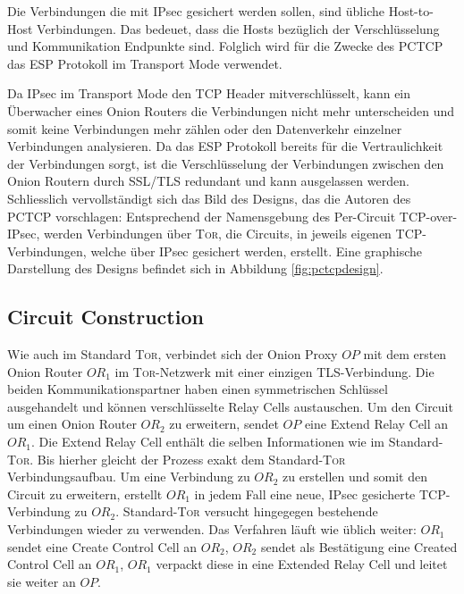 \documentclass[fleqn,envcountsame,runningheads,10pt,a4paper]{llncs}
\begin{document}
Die Verbindungen die mit IPsec gesichert werden sollen, sind übliche Host-to-Host Verbindungen. Das bedeuet, dass die Hosts bezüglich der Verschlüsselung und Kommunikation Endpunkte sind. Folglich wird für die Zwecke des PCTCP das ESP Protokoll im Transport Mode verwendet.

Da IPsec im Transport Mode den TCP Header mitverschlüsselt, kann ein Überwacher eines Onion Routers die Verbindungen nicht mehr unterscheiden und somit keine Verbindungen mehr zählen oder den Datenverkehr einzelner Verbindungen analysieren. Da das ESP Protokoll bereits für die Vertraulichkeit der Verbindungen sorgt, ist die Verschlüsselung der Verbindungen zwischen den Onion Routern durch SSL/TLS redundant und kann ausgelassen werden. Schliesslich vervollständigt sich das Bild des Designs, das die Autoren des PCTCP vorschlagen: Entsprechend der Namensgebung des Per-Circuit TCP-over-IPsec, werden Verbindungen über \textsc{Tor}, die Circuits, in jeweils eigenen TCP-Verbindungen, welche über IPsec gesichert werden, erstellt. Eine graphische Darstellung des Designs befindet sich in Abbildung \ref{fig:pctcpdesign}.

\subsection{Circuit Construction}

Wie auch im Standard \textsc{Tor}, verbindet sich der Onion Proxy $\textit{OP}$ mit dem ersten Onion Router $\textit{OR}_1$ im \textsc{Tor}-Netzwerk mit einer einzigen TLS-Verbindung. Die beiden Kommunikationspartner haben einen symmetrischen Schlüssel ausgehandelt und können verschlüsselte Relay Cells austauschen. Um den Circuit um einen Onion Router $\textit{OR}_2$ zu erweitern, sendet $\textit{OP}$ eine Extend Relay Cell an $\textit{OR}_1$. Die Extend Relay Cell enthält die selben Informationen wie im Standard-\textsc{Tor}. Bis hierher gleicht der Prozess exakt dem Standard-\textsc{Tor} Verbindungsaufbau. Um eine Verbindung zu $\textit{OR}_2$ zu erstellen und somit den Circuit zu erweitern, erstellt $\textit{OR}_1$ in jedem Fall eine neue, IPsec gesicherte TCP-Verbindung zu $\textit{OR}_2$. Standard-\textsc{Tor} versucht hingegegen bestehende Verbindungen wieder zu verwenden. Das Verfahren läuft wie üblich weiter: $\textit{OR}_1$ sendet eine Create Control Cell an $\textit{OR}_2$, $\textit{OR}_2$ sendet als Bestätigung eine Created Control Cell an $\textit{OR}_1$, $\textit{OR}_1$ verpackt diese in eine Extended Relay Cell und leitet sie weiter an $\textit{OP}$.
\end{document}
